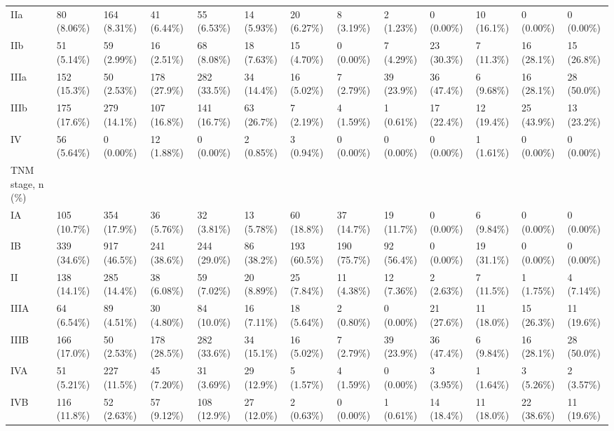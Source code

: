 \begin{landscape}
\begin{center}
\begin{longtable}{p{5.2cm}p{3.0cm}}
IIa & 80 (8.06\%) & 164 (8.31\%) & 41 (6.44\%) & 55 (6.53\%) & 14 (5.93\%) & 20 (6.27\%) & 8 (3.19\%) & 2 (1.23\%) & 0 (0.00\%) & 10 (16.1\%) & 0 (0.00\%) & 0 (0.00\%) \\
IIb & 51 (5.14\%) & 59 (2.99\%) & 16 (2.51\%) & 68 (8.08\%) & 18 (7.63\%) & 15 (4.70\%) & 0 (0.00\%) & 7 (4.29\%) & 23 (30.3\%) & 7 (11.3\%) & 16 (28.1\%) & 15 (26.8\%) \\
IIIa & 152 (15.3\%) & 50 (2.53\%) & 178 (27.9\%) & 282 (33.5\%) & 34 (14.4\%) & 16 (5.02\%) & 7 (2.79\%) & 39 (23.9\%) & 36 (47.4\%) & 6 (9.68\%) & 16 (28.1\%) & 28 (50.0\%) \\
IIIb & 175 (17.6\%) & 279 (14.1\%) & 107 (16.8\%) & 141 (16.7\%) & 63 (26.7\%) & 7 (2.19\%) & 4 (1.59\%) & 1 (0.61\%) & 17 (22.4\%) & 12 (19.4\%) & 25 (43.9\%) & 13 (23.2\%) \\
IV & 56 (5.64\%) & 0 (0.00\%) & 12 (1.88\%) & 0 (0.00\%) & 2 (0.85\%) & 3 (0.94\%) & 0 (0.00\%) & 0 (0.00\%) & 0 (0.00\%) & 1 (1.61\%) & 0 (0.00\%) & 0 (0.00\%) \\
TNM stage, n (\%) &  &  &  &  &  &  &  &  &  &  &  &  \\
IA & 105 (10.7\%) & 354 (17.9\%) & 36 (5.76\%) & 32 (3.81\%) & 13 (5.78\%) & 60 (18.8\%) & 37 (14.7\%) & 19 (11.7\%) & 0 (0.00\%) & 6 (9.84\%) & 0 (0.00\%) & 0 (0.00\%) \\
IB & 339 (34.6\%) & 917 (46.5\%) & 241 (38.6\%) & 244 (29.0\%) & 86 (38.2\%) & 193 (60.5\%) & 190 (75.7\%) & 92 (56.4\%) & 0 (0.00\%) & 19 (31.1\%) & 0 (0.00\%) & 0 (0.00\%) \\
II & 138 (14.1\%) & 285 (14.4\%) & 38 (6.08\%) & 59 (7.02\%) & 20 (8.89\%) & 25 (7.84\%) & 11 (4.38\%) & 12 (7.36\%) & 2 (2.63\%) & 7 (11.5\%) & 1 (1.75\%) & 4 (7.14\%) \\
IIIA & 64 (6.54\%) & 89 (4.51\%) & 30 (4.80\%) & 84 (10.0\%) & 16 (7.11\%) & 18 (5.64\%) & 2 (0.80\%) & 0 (0.00\%) & 21 (27.6\%) & 11 (18.0\%) & 15 (26.3\%) & 11 (19.6\%) \\
IIIB & 166 (17.0\%) & 50 (2.53\%) & 178 (28.5\%) & 282 (33.6\%) & 34 (15.1\%) & 16 (5.02\%) & 7 (2.79\%) & 39 (23.9\%) & 36 (47.4\%) & 6 (9.84\%) & 16 (28.1\%) & 28 (50.0\%) \\
IVA & 51 (5.21\%) & 227 (11.5\%) & 45 (7.20\%) & 31 (3.69\%) & 29 (12.9\%) & 5 (1.57\%) & 4 (1.59\%) & 0 (0.00\%) & 3 (3.95\%) & 1 (1.64\%) & 3 (5.26\%) & 2 (3.57\%) \\
IVB & 116 (11.8\%) & 52 (2.63\%) & 57 (9.12\%) & 108 (12.9\%) & 27 (12.0\%) & 2 (0.63\%) & 0 (0.00\%) & 1 (0.61\%) & 14 (18.4\%) & 11 (18.0\%) & 22 (38.6\%) & 11 (19.6\%) \\

\end{longtable}
\end{center}
\end{landscape}
